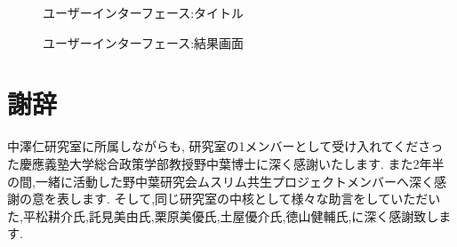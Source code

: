 \begin{figure}[htbp]
  \begin{minipage}{0.5\hsize}
    \begin{center}
    \end{center}
    \caption{ユーザーインターフェース:タイトル}
    \label{fig:halal_checker_title}
  \end{minipage}
  \begin{minipage}{0.5\hsize}
    \begin{center}
    \end{center}
    \caption{ユーザーインターフェース:結果画面}
    \label{fig:halal_checker_result}
  \end{minipage}
\end{figure}

\section{謝辞}
中澤仁研究室に所属しながらも, 研究室の1メンバーとして受け入れてくださった慶應義塾大学総合政策学部教授野中葉博士に深く感謝いたします.
また2年半の間,一緒に活動した野中葉研究会ムスリム共生プロジェクトメンバーへ深く感謝の意を表します.
そして,同じ研究室の中核として様々な助言をしていただいた,平松耕介氏,託見美由氏,栗原美優氏,土屋優介氏,徳山健輔氏,に深く感謝致します.
